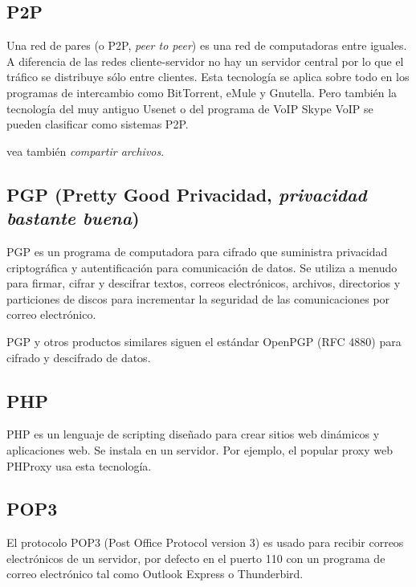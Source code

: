 \subsection{P2P}\label{p2p}

Una red de pares (o P2P, \emph{peer to peer}) es una red de computadoras
entre iguales. A diferencia de las redes cliente-servidor no hay un
servidor central por lo que el tráfico se distribuye sólo entre
clientes. Esta tecnología se aplica sobre todo en los programas de
intercambio como BitTorrent, eMule y Gnutella. Pero también la
tecnología del muy antiguo Usenet o del programa de VoIP Skype VoIP se
pueden clasificar como sistemas P2P.

vea también \emph{compartir archivos}.

\subsection{\texorpdfstring{PGP (Pretty Good Privacidad,
\emph{privacidad bastante
buena})}{PGP (Pretty Good Privacidad, privacidad bastante buena)}}\label{pgp-pretty-good-privacidad-privacidad-bastante-buena}

PGP es un programa de computadora para cifrado que suministra privacidad
criptográfica y autentificación para comunicación de datos. Se utiliza a
menudo para firmar, cifrar y descifrar textos, correos electrónicos,
archivos, directorios y particiones de discos para incrementar la
seguridad de las comunicaciones por correo electrónico.

PGP y otros productos similares siguen el estándar OpenPGP (RFC 4880)
para cifrado y descifrado de datos.

\subsection{PHP}\label{php}

PHP es un lenguaje de scripting diseñado para crear sitios web dinámicos
y aplicaciones web. Se instala en un servidor. Por ejemplo, el popular
proxy web PHProxy usa esta tecnología.

\subsection{POP3}\label{pop3}

El protocolo POP3 (Post Office Protocol version 3) es usado para recibir
correos electrónicos de un servidor, por defecto en el puerto 110 con un
programa de correo electrónico tal como Outlook Express o Thunderbird.

